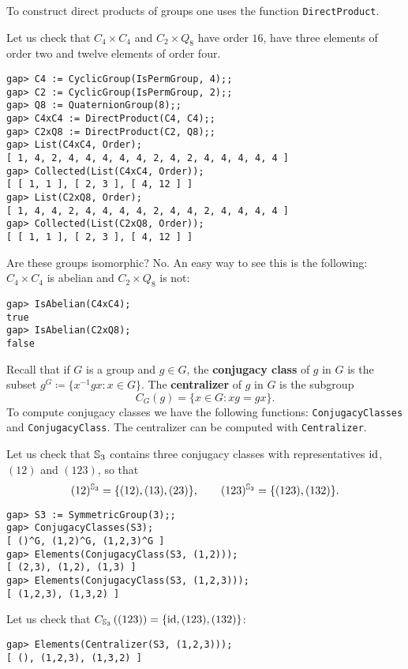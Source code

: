 To construct direct products of groups one uses the function
\lstinline{DirectProduct}. 

\begin{example}
Let us check that $C_4\times C_4$ and 
$C_2\times Q_8$ have order $16$, have three elements of order two and twelve elements of order four. 
\begin{lstlisting}
gap> C4 := CyclicGroup(IsPermGroup, 4);;
gap> C2 := CyclicGroup(IsPermGroup, 2);;
gap> Q8 := QuaternionGroup(8);;
gap> C4xC4 := DirectProduct(C4, C4);;
gap> C2xQ8 := DirectProduct(C2, Q8);;
gap> List(C4xC4, Order);
[ 1, 4, 2, 4, 4, 4, 4, 4, 2, 4, 2, 4, 4, 4, 4, 4 ]
gap> Collected(List(C4xC4, Order));
[ [ 1, 1 ], [ 2, 3 ], [ 4, 12 ] ]
gap> List(C2xQ8, Order);
[ 1, 4, 4, 2, 4, 4, 4, 4, 2, 4, 4, 2, 4, 4, 4, 4 ]
gap> Collected(List(C2xQ8, Order));
[ [ 1, 1 ], [ 2, 3 ], [ 4, 12 ] ]
\end{lstlisting}
Are these groups isomorphic? No. An easy way to see this is the following: 
$C_4\times C_4$ is abelian and $C_2\times Q_8$ is not:
\begin{lstlisting}
gap> IsAbelian(C4xC4);
true
gap> IsAbelian(C2xQ8);
false
\end{lstlisting}
\end{example}

Recall that if $G$ is a group and $g\in G$, the \textbf{conjugacy class} of $g$
in $G$ is the subset $g^G\coloneqq\{x^{-1}gx:x\in G\}$. The \textbf{centralizer} of $g$ in
$G$ is the subgroup
\[
	C_G(g)=\{x\in G:xg=gx\}. 
\]
To compute conjugacy classes we have the following functions:
\lstinline{ConjugacyClasses} and \lstinline{ConjugacyClass}. The centralizer
can be computed with \lstinline{Centralizer}.  

\begin{example}
Let us check that $\mathbb{S}_3$ contains three conjugacy classes with
representatives $\operatorname{id}$, $(12)$ and $(123)$, so that 
\[(12)^{\mathbb{S}_3}=\{(12),(13),(23)\}, \qquad (123)^{\mathbb{S}_3}=\{(123),(132)\}.\]
\begin{lstlisting}
gap> S3 := SymmetricGroup(3);;
gap> ConjugacyClasses(S3);
[ ()^G, (1,2)^G, (1,2,3)^G ]
gap> Elements(ConjugacyClass(S3, (1,2)));
[ (2,3), (1,2), (1,3) ]
gap> Elements(ConjugacyClass(S3, (1,2,3)));
[ (1,2,3), (1,3,2) ]
\end{lstlisting}
Let us check that $C_{\mathbb{S}_3}\left( (123) \right)=\{\operatorname{id},(123),(132)\}$: 
\begin{lstlisting}
gap> Elements(Centralizer(S3, (1,2,3)));
[ (), (1,2,3), (1,3,2) ]
\end{lstlisting}
\end{example}

